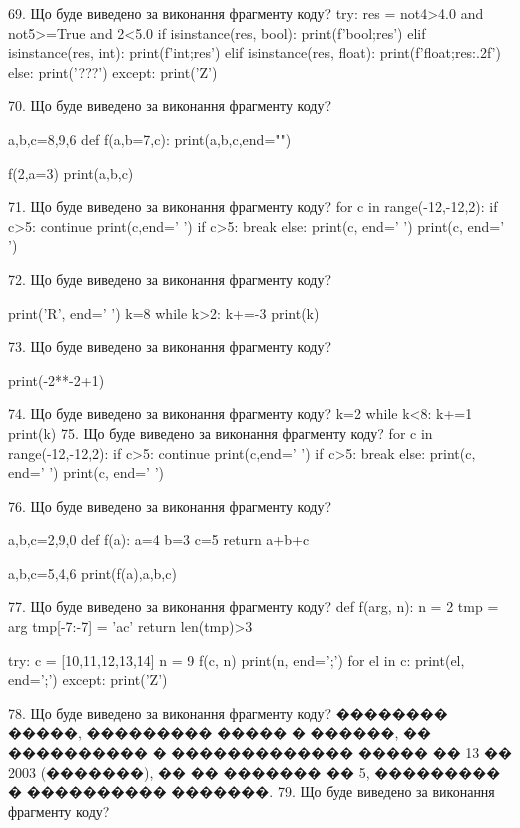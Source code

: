 \documentclass[11pt]{article}
\begin{document}
69. Що буде виведено за виконання фрагменту коду?
try:
    res = not4>4.0 and not5>=True and 2<5.0
    if isinstance(res, bool):
        print(f'bool;{res}')
    elif isinstance(res, int):
        print(f'int;{res}')
    elif isinstance(res, float):
        print(f'float;{res:.2f}')
    else:
        print('???')
except:
    print('Z')

70. Що буде виведено за виконання фрагменту коду?

a,b,c=8,9,6
def f(a,b=7,c):
    print(a,b,c,end="")

f(2,a=3)
print(a,b,c)


71. Що буде виведено за виконання фрагменту коду?
for c in range(-12,-12,2):
    if c>5:
        continue
        print(c,end=' ')
    if c>5:
        break
else:
    print(c, end=' ')
print(c, end=' ')

72. Що буде виведено за виконання фрагменту коду?

print('R', end=' ')
k=8
while k>2:
    k+=-3
print(k)


73. Що буде виведено за виконання фрагменту коду?

print(-2**-2+1)

74. Що буде виведено за виконання фрагменту коду?
k=2
   while k<8: k+=1
   print(k)
75. Що буде виведено за виконання фрагменту коду?
for c in range(-12,-12,2):
    if c>5:
        continue
        print(c,end=' ')
    if c>5:
        break
else:
    print(c, end=' ')
print(c, end=' ')

76. Що буде виведено за виконання фрагменту коду?

a,b,c=2,9,0
def f(a):
    a=4
    b=3
    c=5
    return a+b+c

a,b,c=5,4,6
print(f(a),a,b,c)

77. Що буде виведено за виконання фрагменту коду?
def f(arg, n):
    n = 2
    tmp = arg
    tmp[-7:-7] = 'ac'
    return len(tmp)>3

try:
    c = [10,11,12,13,14]
    n = 9
    f(c, n)
    print(n, end=';')
    for el in c:
        print(el, end=';')
except:
    print('Z')

78. Що буде виведено за виконання фрагменту коду?
�������� �����, ��������� ����� � ������, �� ���������� � ������������� ����� �� 13 �� 2003 (�������), �� �� ������� �� 5, ��������� � ���������� �������.
79. Що буде виведено за виконання фрагменту коду?
\end{document}
